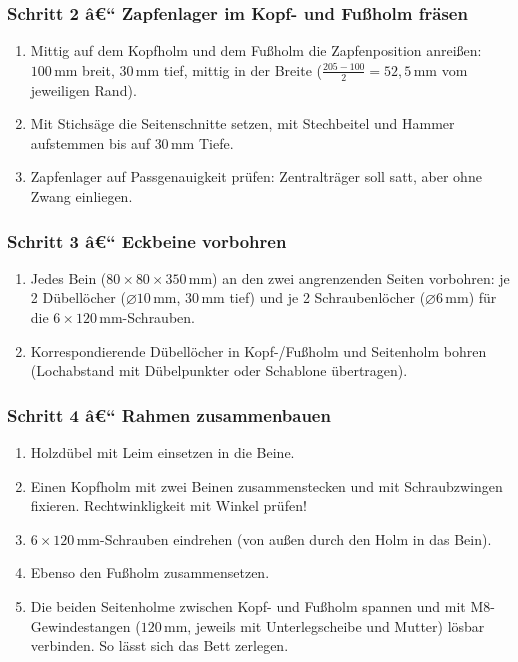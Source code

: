 ﻿\documentclass[12pt,a4paper]{article}
\theoremstyle{definition}
\theoremstyle{plain}
\theoremstyle{remark}
\begin{document}
\subsubsection*{Schritt 2 â€“ Zapfenlager im Kopf- und Fußholm fräsen}

\begin{enumerate}
  \item Mittig auf dem Kopfholm und dem Fußholm die Zapfenposition
        anreißen: $100\,\text{mm}$ breit, $30\,\text{mm}$ tief, mittig in der Breite
        ($\frac{205 - 100}{2} = 52{,}5\,\text{mm}$ vom jeweiligen Rand).
  \item Mit Stichsäge die Seitenschnitte setzen, mit Stechbeitel und
        Hammer aufstemmen bis auf $30\,\text{mm}$ Tiefe.
  \item Zapfenlager auf Passgenauigkeit prüfen: Zentralträger soll satt,
        aber ohne Zwang einliegen.
\end{enumerate}

\subsubsection*{Schritt 3 â€“ Eckbeine vorbohren}

\begin{enumerate}
  \item Jedes Bein ($80 \times 80 \times 350\,\text{mm}$) an den zwei angrenzenden
        Seiten vorbohren: je 2 Dübellöcher ($\varnothing 10\,\text{mm}$, $30\,\text{mm}$
        tief) und je 2 Schraubenlöcher ($\varnothing 6\,\text{mm}$) für die
        $6 \times 120\,\text{mm}$-Schrauben.
  \item Korrespondierende Dübellöcher in Kopf-/Fußholm und Seitenholm
        bohren (Lochabstand mit Dübelpunkter oder Schablone übertragen).
\end{enumerate}

\subsubsection*{Schritt 4 â€“ Rahmen zusammenbauen}

\begin{enumerate}
  \item Holzdübel mit Leim einsetzen in die Beine.
  \item Einen Kopfholm mit zwei Beinen zusammenstecken und mit
        Schraubzwingen fixieren. Rechtwinkligkeit mit Winkel prüfen!
  \item $6 \times 120\,\text{mm}$-Schrauben eindrehen (von außen durch den Holm
        in das Bein).
  \item Ebenso den Fußholm zusammensetzen.
  \item Die beiden Seitenholme zwischen Kopf- und Fußholm spannen
        und mit M8-Gewindestangen ($120\,\text{mm}$, jeweils mit Unterlegscheibe
        und Mutter) lösbar verbinden. So lässt sich das Bett zerlegen.
\end{enumerate}
\end{document}
